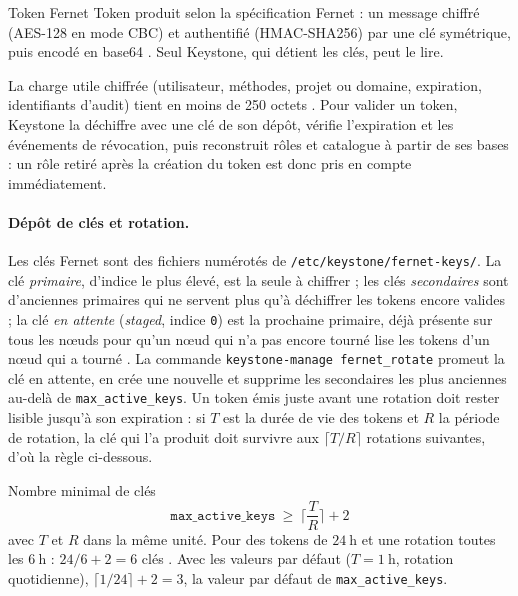 \begin{definition}{Token Fernet}
Token produit selon la spécification Fernet : un message chiffré (AES-128 en mode CBC) et authentifié
(HMAC-SHA256) par une clé symétrique, puis encodé en base64 \parencite{fernet-spec}. Seul Keystone,
qui détient les clés, peut le lire.
\end{definition}

La charge utile chiffrée (utilisateur, méthodes, projet ou domaine, expiration, identifiants d'audit) tient en moins de 250 octets
\parencite{keystone-fernet}. Pour valider un token, Keystone la déchiffre avec une clé de son dépôt, vérifie l'expiration et les
événements de révocation, puis reconstruit rôles et catalogue à partir de ses bases : un rôle retiré après la création du token est
donc pris en compte immédiatement.

\paragraph{Dépôt de clés et rotation.} Les clés Fernet sont des fichiers numérotés de \texttt{/etc/keystone/fernet-keys/}. La clé
\emph{primaire}, d'indice le plus élevé, est la seule à chiffrer ; les clés \emph{secondaires} sont d'anciennes primaires qui ne
servent plus qu'à déchiffrer les tokens encore valides ; la clé \emph{en attente} (\emph{staged}, indice \texttt{0}) est la
prochaine primaire, déjà présente sur tous les nœuds pour qu'un nœud qui n'a pas encore tourné lise les tokens d'un nœud qui a tourné
\parencite{keystone-fernet}. La commande \texttt{keystone-manage fernet\_rotate} promeut la clé en attente, en crée une nouvelle et
supprime les secondaires les plus anciennes au-delà de \texttt{max\_active\_keys}. Un token émis juste avant une rotation doit rester
lisible jusqu'à son expiration : si $T$ est la durée de vie des tokens et $R$ la période de rotation, la clé qui l'a produit doit survivre
aux $\lceil T/R\rceil$ rotations suivantes, d'où la règle ci-dessous.

\begin{resultat}{Nombre minimal de clés}
\[
  \texttt{max\_active\_keys}\ \geq\ \Big\lceil \frac{T}{R}\Big\rceil + 2
\]
avec $T$ et $R$ dans la même unité. Pour des tokens de $24\ \mathrm{h}$ et une rotation toutes les
$6\ \mathrm{h}$ : $24/6+2=6$ clés \parencite{keystone-fernet}. Avec les valeurs par défaut
($T=1\ \mathrm{h}$, rotation quotidienne), $\lceil 1/24\rceil+2=3$, la valeur par défaut de
\texttt{max\_active\_keys}.
\end{resultat}

